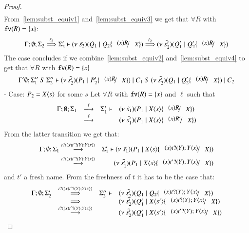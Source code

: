 \begin{proof}
\begin{eqnarray}
	\end{eqnarray}
%
	\noi From~\ref{lem:subst_equiv1} and~\ref{lem:subst_equiv3} we get that $\forall R$ with $\mathtt{fv}(R) = \{x\}$:
%
	\begin{eqnarray*}
		\Gamma; \es; \Sigma_2 \By{\ell_2} \Sigma_2' \proves \newsp{\tilde{s_2}}{Q_1 \Par Q_2 \subst{(x) R}{X}} \By{\ell_2} \newsp{\tilde{s_2'}}{Q_1' \Par Q_2' \subst{(x) R}{X}}
	\end{eqnarray*}
%
	\noi The case concludes if we combine~\ref{lem:subst_equiv2} and~\ref{lem:subst_equiv4} to get that $\forall R$ with $\mathtt{fv}(R) = \{x\}$
%
	\begin{eqnarray*}
		\Gamma' \es; \Sigma_1''\ S\ \Sigma_2'' \proves \newsp{\tilde{s_2'}}{P_1 \Par P_2' \subst{(x) R}{X}} \Par C_1\ S\ \newsp{\tilde{s_2'}}{Q_1 \Par Q_2' \subst{(x) R}{X}} \Par C_2
	\end{eqnarray*}
	\noi - Case: $P_2 = X\langle s \rangle$ for some $s$
%
	Let $\forall R$ with $\mathtt{fv}(R) = \{x\}$ and $\ell$ such that
\[
	\begin{array}{rcll}
		\Gamma; \es; \Sigma_1 &\by{\ell}& \Sigma_1' \proves & \newsp{\tilde{s_1}}{P_1 \Par \appl{X}{s} \subst{(x) R}{X}}\\
		&\by{\ell}& &
		\newsp{\tilde{s_1'}}{P_1 \Par \appl{X}{s} \subst{(x) R'}{X}}
	\end{array}
\]
%
	\noi From the latter transition we get that:
%
	\begin{eqnarray}
		\Gamma; \es; \Sigma_1 &\by{\bactinp{t}{(x) \binp{t'}{Y} \appl{Y}{x}}}& \Sigma_1' \proves \newsp{\tilde{s_1}}{P_1 \Par \appl{X}{s} \subst{(x) \binp{t}{Y} \appl{Y}{x}}{X}}\\
		&\by{\bactinp{t}{(x) \binp{t'}{Y} \appl{Y}{x}}}& 
		\newsp{\tilde{s_1'}}{P_1 \Par \appl{X}{s} \subst{(x) \binp{t'}{Y} \appl{Y}{x}}{X}}
		\label{lem:subst_equiv5}
	\end{eqnarray}
%
	\noi and $t'$ a fresh name. From the freshness of $t$ it has to be the case that:
%
\[
	\begin{array}{rcll}
		\Gamma; \es; \Sigma_2' &\By{\bactinp{t}{(x) \binp{t'}{Y} \appl{Y}{x}}}& \Sigma_2'' \proves &
		\newsp{\tilde{s_2'}}{Q_1 \Par Q_2 \subst{(x) \binp{t}{Y} \appl{Y}{x}}{X}}\\
		&\By{}& &
		\newsp{\tilde{s_2'}}{Q_1' \Par \appl{X}{s'} \subst{(x)\binp{t}{Y} \appl{Y}{x}}{X}} \\
		&\by{\bactinp{t}{(x) \binp{t'}{Y} \appl{Y}{x}}}& &
		\newsp{\tilde{s_2'}}{Q_1' \Par \appl{X}{s'} \subst{(x)\binp{t'}{Y} \appl{Y}{x}}{X}} \\

\end{array}\]
\end{proof}
